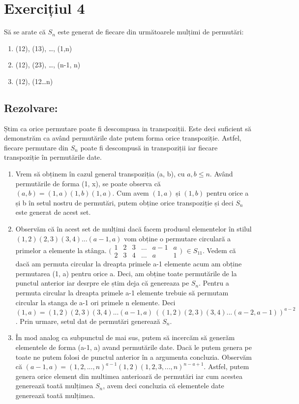 \documentclass{article}
\begin{document}
\section{Exercițiul 4}
Să se arate că $S_n$ este generat de fiecare din următoarele mulțimi de permutări:
\begin{enumerate}
    \item (12), (13), \dots, (1,n)
    \item (12), (23), \dots, (n-1, n)
    \item (12), (12\dots n)
    
\end{enumerate}

\subsection{Rezolvare:}
Știm ca orice permutare poate fi descompusa in transpoziții. Este deci suficient să demonstrăm ca având permutările date putem forma orice transpoziție. Astfel, fiecare permutare din $S_{n}$ poate fi descompusă in transpoziții iar fiecare transpoziție în permutările date.
\begin {enumerate}
    \item Vrem să obținem în cazul general transpoziția (a, b), cu $a, b \leq n$. Având permutările de forma (1, x), se poate observa că $(a, b) = (1, a) (1, b) (1, a)$. Cum avem $(1, a)$ și $(1, b)$ pentru orice a și b în setul nostru de permutări, putem obține orice transpoziție și deci $S_{n}$ este generat de acest set.
    \item Observăm că în acest set de mulțimi dacă facem produsul elementelor în stilul $(1,2)(2,3)(3,4)...(a-1, a)$ vom obține o permutare circulară a primelor a elemente la stânga. $\bigl(\begin{smallmatrix}
    1 & 2 & 3 & \dots & a-1 & a \\
    2 & 3 & 4 & \dots & a & 1
  \end{smallmatrix}\bigr)$ $\in S_{11}$. Vedem că dacă am permuta circular la dreapta primele a-1 elemente acum am obține permutarea (1, a) pentru orice a. Deci, am obține toate permutările de la punctul anterior iar desrpre ele știm deja că genereaza pe $S_{n}$. Pentru a permuta circular la dreapta primele a-1 elemente trebuie să permutam circular la stanga de a-1 ori primele n elemente. Deci $(1,a)=(1,2)(2,3)(3,4)...(a-1, a) \ ((1,2)(2,3)(3,4)...(a-2,a-1))^{a-2}$. Prin urmare, setul dat de permutări generează $S_{n}$.
  \item În mod analog ca subpunctul de mai sus, putem să incercăm să generăm elementele de forma (a-1, a) avand permutările date. Dacă le putem genera pe toate ne putem folosi de punctul anterior în a argumenta concluzia. Observăm că $(a-1, a) = (1, 2, ..., n)^{a-1}(1,2)(1, 2, 3, ..., n)^{n-a+1}$. Astfel, putem genera orice element din multimea anterioară de permutări iar cum acestea generează toată mulțimea $S_{n}$, avem deci concluzia că elementele date generează toată mulțimea.

\end {enumerate}
\end{document}
